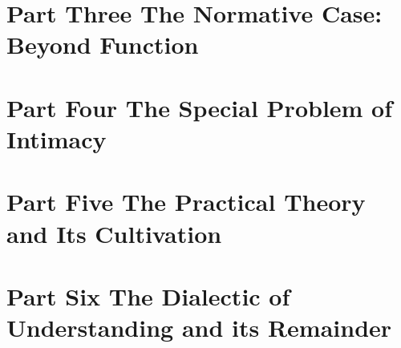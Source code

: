 \documentclass[11pt,a4paper]{article}
\begin{document}
\part*{\textcolor{rosedeep}{Part Three \quad The Normative Case: Beyond Function}}





\part*{\textcolor{rosedeep}{Part Four \quad The Special Problem of Intimacy}}




\part*{\textcolor{rosedeep}{Part Five \quad The Practical Theory and Its Cultivation}}







\part*{\textcolor{rosedeep}{Part Six \quad The Dialectic of Understanding and its Remainder}}
\end{document}
